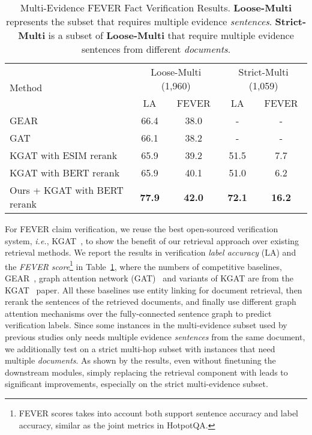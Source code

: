 \begin{table}[t]
    \centering
    \small
    \vspace{-0.2in}
    \caption{Multi-Evidence FEVER Fact Verification Results. \textbf{Loose-Multi} represents the subset that requires multiple evidence \textit{sentences}. \textbf{Strict-Multi} is a subset of \textbf{Loose-Multi} that require multiple evidence sentences from different \textit{documents}.}
    \begin{tabular}{l|cccc}
        \toprule
      \multirow{2}{*}{Method} &  \multicolumn{2}{c}{Loose-Multi (1,960)} &  \multicolumn{2}{c}{Strict-Multi (1,059)} \\
      & LA & FEVER & LA & FEVER \\
        \midrule
       GEAR & 66.4 & 38.0 & - & - \\
       GAT & 66.1 & 38.2 & - & -\\
       KGAT with ESIM rerank & 65.9 & 39.2 & 51.5 & 7.7\\
       KGAT with BERT rerank & 65.9 & 40.1 & 51.0 & 6.2 \\
       \midrule
       Ours + KGAT with BERT rerank  & \textbf{77.9} & \textbf{42.0} & \textbf{72.1} & \textbf{16.2}\\
        \bottomrule
    \end{tabular}
    \label{tab:fever_final}
    \vspace{-0.15in}
\end{table}
For FEVER claim verification, we reuse the best open-sourced verification system, \emph{i.e.}, KGAT~\citep{KGAT}, to show the benefit of our retrieval approach over existing retrieval methods. 
We report the results in verification \emph{label accuracy} (LA) and the \emph{FEVER score}\footnote{FEVER scores takes into account both support sentence accuracy and label accuracy, similar as the joint metrics in HotpotQA.} in Table~\ref{tab:fever_final}, where the numbers of competitive baselines, GEAR~\citep{GEAR}, graph attention network (GAT)~\citep{GAT} and variants of KGAT
are from the KGAT~\citep{KGAT} paper.
All these baselines use entity linking for document retrieval, then rerank the sentences of the retrieved documents, and finally use different graph attention mechanisms over the fully-connected sentence graph to predict verification labels.
Since some instances in the multi-evidence subset used by previous studies only needs multiple evidence \textit{sentences} from the same document, we additionally test on a strict multi-hop subset with instances that need multiple \textit{documents}.
As shown by the results, even without finetuning the downstream modules, simply replacing the retrieval component with \method leads to significant improvements, especially on the strict multi-evidence subset.

